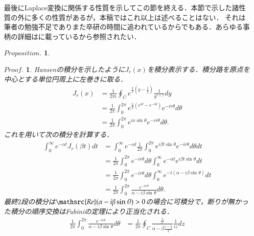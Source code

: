 \documentclass[a4j,papersize,disablejfam,slide,14pt]{jsarticle}
\newtheorem{Prop}{$Proposition.$}
\newtheorem{Proof}{$Proof.$}
\def\sin#1#2{\operatorname{sin}^{#2} #1} %
\def\exp#1{e^{#1}} %
\begin{document}
    最後に{\rm Laplace}変換に関係する性質を示してこの節を終える．本節で示した諸性質の外に多くの性質があるが，本稿ではこれ以上は述べることはない．
    それは筆者の勉強不足でありまた卒研の時間に追われているからでもある．あらゆる事柄の詳細は\cite{terakan}に載っているから参照されたい．
    \begin{screen}
    	\begin{Prop}
        	
        \end{Prop}
    \end{screen}
    \begin{Proof}
    	{\rm Hansen}の積分を示したように$J_r(x)$を積分表示する．積分路を原点を中心とする単位円周上に左巻きに取る．
        \begin{align}
        	J_r(x) &= \frac{1}{2 \pi i} \oint_{C} \exp{\frac{x}{2}\left( y-\frac{1}{y} \right)}\frac{1}{y^{r+1}} dy \\
            &= \frac{1}{2 \pi} \int_{0}^{2\pi} \exp{\frac{x}{2}(\exp{i\theta} - \exp{-i\theta})} \exp{-ir\theta} d\theta \\
            &= \frac{1}{2 \pi} \int_{0}^{2\pi} \exp{ix\sin{\theta}{}} \exp{-ir\theta} d\theta.
        \end{align}
        これを用いて次の積分を計算する．
        \begin{align}
        	\int_{0}^{\infty} \exp{-\alpha t} J_r(\beta t) dt 
            &= \int_{0}^{\infty} \exp{-\alpha t} \frac{1}{2 \pi} \int_{0}^{2\pi} \exp{i \beta t\sin{\theta}{}} \exp{-ir\theta} d\theta dt \\
        	&= \frac{1}{2\pi} \int_{0}^{2\pi} \exp{-ir\theta} d\theta \int_{0}^{\infty} \exp{-\alpha t} \exp{i \beta t\sin{\theta}{}} dt \\
            &= \frac{1}{2\pi} \int_{0}^{2\pi} \exp{-ir\theta} d\theta \int_{0}^{\infty} \exp{-t(\alpha-i\beta\sin{\theta}{})} dt \\
            &= \frac{1}{2\pi} \int_{0}^{2\pi} \frac{\exp{-ir\theta}}{\alpha-i\beta\sin{\theta}{}} d\theta.
        \end{align}
        最終$2$段の積分は$\mathsrc{Re}(\alpha-i\beta\sin{\theta}{}) > 0$の場合に可積分で，断りが無かった積分の順序交換は{\rm Fubini}の定理により正当化される．
        \begin{align}
        	\frac{1}{2\pi} \int_{0}^{2\pi} \frac{\exp{-ir\theta}}{\alpha-i\beta\sin{\theta}{}} d\theta
            	&= \frac{1}{2\pi} \oint_{C} \frac{\frac{1}{z^r}}{\alpha - \beta \frac{z - \frac{1}{z}}{2}} \frac{1}{iz}dz \\

\end{align}
\end{Proof}
\end{document}
